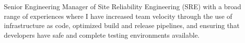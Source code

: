 

\begin{cvparagraph}

Senior Engineering Manager of Site Reliability Engineering (SRE) with a broad range of experiences where I have increased team velocity through the use of infrastructure as code, optimized build and release pipelines, and ensuring that developers have safe and complete testing environments available.
\end{cvparagraph}
